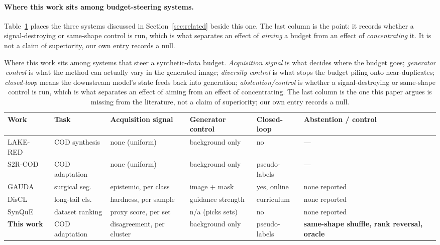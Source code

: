 \documentclass{article}
\begin{document}
\paragraph{Where this work sits among budget-steering systems.} Table~\ref{tab:closest} places the
three systems discussed in Section~\ref{sec:related} beside this one. The last column is the point: it records whether a signal-destroying or same-shape control is run, which is what separates an
effect of \emph{aiming} a budget from an effect of \emph{concentrating} it. It is not a claim of
superiority, our own entry records a null.

\begin{table}[t]
\caption{Where this work sits among systems that steer a synthetic-data budget. \emph{Acquisition
signal} is what decides where the budget goes; \emph{generator control} is what the method can
actually vary in the generated image; \emph{diversity control} is what stops the budget piling onto
near-duplicates; \emph{closed-loop} means the downstream model's state feeds back into generation;
\emph{abstention/control} is whether a signal-destroying or same-shape control is run, which is what separates an effect of aiming from an effect of concentrating. The last column is the one this paper argues is missing from the literature, not a claim of superiority; our own entry records a
null.}
\label{tab:closest}
\begin{center}
\small
\setlength{\tabcolsep}{3pt}
\footnotesize
\begin{tabular}{@{}lp{1.75cm}p{1.9cm}p{1.75cm}p{1.35cm}p{1.9cm}@{}}
\toprule
Work & Task & Acquisition signal & Generator control & Closed-loop & Abstention / control \\
\midrule
LAKE-RED~\citep{zhao2024lakered} & COD synthesis & none (uniform) & background only & no & --- \\
S2R-COD~\citep{luo2025s2rcod} & COD adaptation & none (uniform) & background only & pseudo-labels & --- \\
GAUDA~\citep{frisch2025gauda} & surgical seg. & epistemic, per class & image + mask & yes, online & none reported \\
DisCL~\citep{liang2025discl} & long-tail cls. & hardness, per sample & guidance strength & curriculum & none reported \\
SynQuE~\citep{chen2025synque} & dataset ranking & proxy score, per set & n/a (picks sets) & no & none reported \\
\midrule
\textbf{This work} & COD adaptation & disagreement, per cluster & background only & pseudo-labels &
\textbf{same-shape shuffle, rank reversal, oracle} \\
\bottomrule
\end{tabular}
\end{center}
\end{table}
\end{document}
